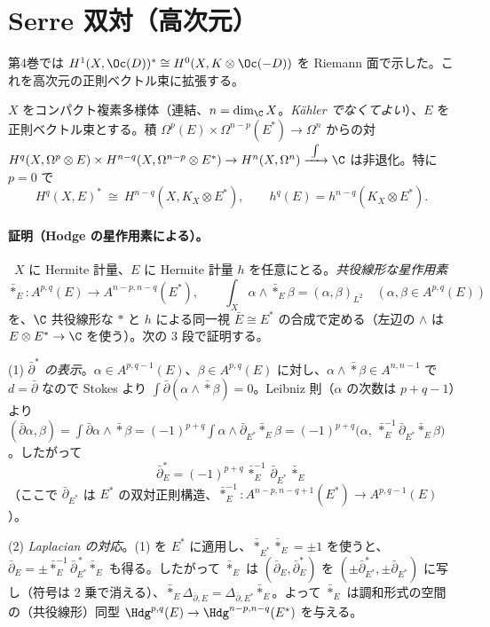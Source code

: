 \section{Serre 双対（高次元）}\label{sec:serredual}

第4巻では $H^1(X,\Oc(D))^*\cong H^0(X,K\otimes\Oc(-D))$ を Riemann 面で示した。これを高次元の正則ベクトル束に拡張する。

\begin{thm}[Serre 双対]\label{thm:serre}\tC
$X$ をコンパクト複素多様体（連結、$n=\dim_\C X$。\emph{Kähler でなくてよい}）、$E$ を正則ベクトル束とする。積 $\Omega^{p}(E)\times\Omega^{n-p}(E^*)\to\Omega^{n}$ からの対 $H^q(X,\Omega^p\otimes E)\times H^{n-q}(X,\Omega^{n-p}\otimes E^*)\to H^n(X,\Omega^n)\xrightarrow{\ \int\ }\C$ は非退化。特に $p=0$ で
\[
H^q(X,E)^*\ \cong\ H^{n-q}(X,K_X\otimes E^*),\qquad h^q(E)=h^{n-q}(K_X\otimes E^*) .
\]
\end{thm}
\paragraph{証明（Hodge の星作用素による）。}\tP\ $X$ に Hermite 計量、$E$ に Hermite 計量 $h$ を任意にとる。\emph{共役線形な星作用素}
\[
\bar\ast_E:A^{p,q}(E)\to A^{n-p,n-q}(E^*),\qquad \int_X\alpha\wedge\bar\ast_E\beta=(\alpha,\beta)_{L^2}\quad(\alpha,\beta\in A^{p,q}(E))
\]
を、$\C$ 共役線形な $\ast$ と $h$ による同一視 $\bar E\cong E^*$ の合成で定める（左辺の $\wedge$ は $E\otimes E^*\to\C$ を使う）。次の 3 段で証明する。

(1) \emph{$\bar\partial^*$ の表示}。$\alpha\in A^{p,q-1}(E)$、$\beta\in A^{p,q}(E)$ に対し、$\alpha\wedge\bar\ast\beta\in A^{n,n-1}$ で $d=\bar\partial$ なので Stokes より $\int\bar\partial(\alpha\wedge\bar\ast\beta)=0$。Leibniz 則（$\alpha$ の次数は $p+q-1$）より
$(\bar\partial\alpha,\beta)=\int\bar\partial\alpha\wedge\bar\ast\beta=(-1)^{p+q}\int\alpha\wedge\bar\partial_{E^*}\bar\ast_E\beta=(-1)^{p+q}\big(\alpha,\ \bar\ast_E^{-1}\bar\partial_{E^*}\bar\ast_E\beta\big)$。したがって
\[
\bar\partial_E^*=(-1)^{p+q}\,\bar\ast_E^{-1}\,\bar\partial_{E^*}\,\bar\ast_E
\]
（ここで $\bar\partial_{E^*}$ は $E^*$ の双対正則構造、$\bar\ast_E^{-1}:A^{n-p,n-q+1}(E^*)\to A^{p,q-1}(E)$）。

(2) \emph{Laplacian の対応}。(1) を $E^*$ に適用し、$\bar\ast_{E^*}\bar\ast_E=\pm1$ を使うと、$\bar\partial_E=\pm\bar\ast_E^{-1}\bar\partial_{E^*}^{\,*}\bar\ast_E$ も得る。したがって $\bar\ast_E$ は $(\bar\partial_E,\bar\partial_E^*)$ を $(\pm\bar\partial_{E^*}^*,\pm\bar\partial_{E^*})$ に写し（符号は 2 乗で消える）、$\bar\ast_E\Delta_{\bar\partial,E}=\Delta_{\bar\partial,E^*}\bar\ast_E$。よって $\bar\ast_E$ は調和形式の空間の（共役線形）同型 $\Hdg^{p,q}(E)\to\Hdg^{n-p,n-q}(E^*)$ を与える。

